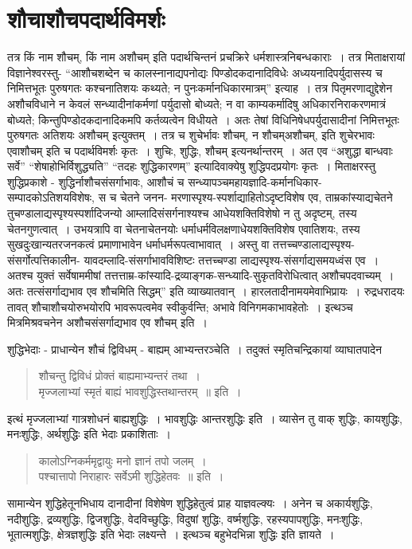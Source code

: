 {\section*{शौचाशौचपदार्थविमर्शः}

तत्र किं नाम शौचम्, किं नाम अशौचम् इति पदार्थचिन्तनं प्रचक्रिरे धर्मशास्त्रनिबन्ध\-काराः~। तत्र मिताक्षरायां विज्ञानेश्वरस्तु- “आशौचशब्देन च कालस्नानाद्यपनोद्यः पिण्डोदकदानादि\-विधेः अध्ययनादिपर्युदासस्य च निमित्तभूतः पुरुषगतः कश्चनातिशयः कथ्यते; न पुनः\break कर्मानधिकारमात्रम्” इत्याह~। तत्र पितृमरणाद्युद्देशेन अशौचविधाने न केवलं सन्ध्यादीनां\break कर्मणां पर्युदासो बोध्यते; न वा काम्यकर्मादिषु अधिकारनिराकरणमात्रं बोध्यते; किन्तु\break पिण्डोदकदानादिकमपि कर्तव्यत्वेन विधीयते~। अतः तेषां विधिनिषेधपर्युदासादीनां निमित्त\-भूतः पुरुषगतः अतिशयः अशौचम् इत्युक्तम्~। तत्र च शुचेर्भावः शौचम्, न शौचम्\break अशौचम्, इति शुचेरभावः एवाशौचम् इति च पदार्थविमर्शः कृतः~। शुचिः, शुद्धिः, \-शौचम् इत्यनर्थान्तरम्~। अत एव “अशुद्धा बान्धवाः सर्वे” “शेषाहोभिर्विशुद्ध्यति” “तदहः शुद्धि\-कारणम्” इत्यादिवाक्येषु शुद्धिपदप्रयोगः कृतः~। मिताक्षरस्तु शुद्धिप्रकाशे - शुद्धिर्नाशौच\-संसर्गाभावः, आशौचं च सन्ध्यापञ्चमहायज्ञादि-कर्मानधिकार-सम्पादकोऽतिशयविशेषः, स च चेतने जनन- मरणास्पृश्य-स्पर्शाद्याहितोऽदृष्टविशेष एव, ताम्रकांस्याद्यचेतने तु\break चण्डालाद्यस्पृश्यस्पर्शादिजन्यो आम्लादिसंसर्गनाश्यश्च आधेयशक्तिविशेषो न तु अदृष्टम्, तस्य चेतनगुणत्वात्~। उभयत्रापि वा चेतनाचेतनयोः धर्माधर्मविलक्षणाधेयशक्तिविशेष एवातिशयः, तस्य सुखदुःखान्यतरजनकत्वं प्रमाणाभावेन धर्माधर्मरूपत्वाभावात्~। अस्तु वा तत्तच्चण्डालाद्यस्पृश्य-संसर्गोत्पत्तिकालीन- यावदम्लादि-संसर्गाभावविशिष्टः तत्तच्चण्डा लाद्यस्पृश्य-संसर्गाद्यसमयध्वंस एव~। अतश्च युक्तं सर्वेषाममीषां तत्तत्ताम्र-कांस्यादि-द्रव्या\-ङ्गक-सन्ध्यादि-सुकृतविरोधित्वात् अशौचपदवाच्यम्~। अतः तत्संसर्गाद्यभाव एव शौचमिति सिद्धम्” इति व्याख्यातवान्~। हारलतादीनामयमेवाभिप्रायः~। रुद्रधरादयः तावत् शौचाशौचयोरुभयोरपि भावरूपत्वमेव स्वीकुर्वन्ति; अभावे विनिगमकाभावहेतोः~।  इत्थञ्च मित्रमिश्रवचनेन अशौचसंसर्गाद्यभाव एव शौचम् इति~। 

शुद्धिभेदाः - प्राधान्येन शौचं द्विविधम् - बाह्यम् आभ्यन्तरञ्चेति~। तदुक्तं स्मृतिचन्द्रिकायां व्याघातपादेन 

\begin{verse}
शौचन्तु द्विविधं प्रोक्तं बाह्यमाभ्यन्तरं तथा~। \\
मृज्जलाभ्यां स्मृतं बाह्यं भावशुद्धिस्तथान्तरम्~॥ इति~। 
\end{verse}
इत्थं मृज्जलाभ्यां गात्रशोधनं बाह्यशुद्धिः~। भावशुद्धिः आन्तरशुद्धिः इति~। व्यासेन तु वाक् शुद्धिः, कायशुद्धिः, मनःशुद्धिः, अर्थशुद्धिः इति भेदाः प्रकाशिताः~। 
\begin{verse}
कालोऽग्निकर्ममृद्वायुः मनो ज्ञानं तपो जलम्~। \\
पश्चात्तापो निराहारः सर्वेऽमी शुद्धिहेतवः~॥ इति~। 
\end{verse}
सामान्येन शुद्धिहेतूनभिधाय दानादीनां विशेषेण शुद्धिहेतुत्वं प्राह याज्ञवल्क्यः~। अनेन च अकार्यशुद्धिः, नदीशुद्धिः, द्रव्यशुद्धिः, द्विजशुद्धिः, वेदविच्छुद्धिः, विदुषां शुद्धिः, वर्ष्मशुद्धिः, रहस्यपापशुद्धिः, मनःशुद्धिः, भूतात्मशुद्धिः, क्षेत्रज्ञशुद्धिः इति भेदाः लक्ष्यन्ते~।  इत्थञ्च बहुभेदभिन्ना शुद्धिः इति ज्ञायते~। 

}
